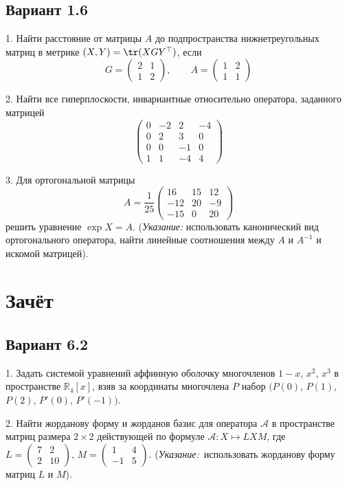 \documentclass[a4paper]{article}
\begin{document}
\subsection{Вариант 1.6}

1. Найти расстояние от матрицы $A$ до подпространства
нижнетреугольных матриц в метрике $(X, Y)=\tr (XGY^\top)$, если
$$
G=\left(\begin{array}{rr} 2 & 1\\
1 & 2
\end{array}\right) ,\qquad
A=\left(
\begin{array}{rr} 1 & 2\\
1 & 1
\end{array}\right)
$$

2. Найти все гиперплоскости, инвариантные относительно оператора,
заданного матрицей
$$
\left(
\begin{array}{rrrr}
0 & -2& 2 & -4\\
0 & 2 & 3 & 0\\
0 & 0 & -1 &0 \\
1 & 1 & -4 &4
\end{array}\right )
$$

3. Для ортогональной матрицы
$$
A=\frac{1}{25} \left(
\begin{array}{rrr}
16 & 15 & 12\\
-12 & 20 & -9 \\
-15 & 0 & 20
\end{array}\right)
$$
решить уравнение $\exp X=A$. ({\it Указание:} использовать
канонический вид ортогонального оператора, найти линейные
соотношения между $A$ и $A^{-1}$  и искомой матрицей).

\section{Зачёт }

\subsection{Вариант 6.2}

1. Задать системой уравнений аффинную оболочку многочленов $1-x$,
$x^2$, $x^3$ в пространстве $\mathbb{R}_4[x]$, взяв за координаты
многочлена $P$ набор $(P(0)$, $P(1)$, $P(2)$, $P'(0)$, $P'(-1))$.

2. Найти жорданову форму и жорданов базис для оператора
$\mathcal{A}$ в пространстве матриц размера $2\times 2$
действующей по формуле $\mathcal{A}: X \longmapsto LXM$, где
$L=\left(\begin{array}{rr} 7 & 2 \\ 2 & 10 \end{array}\right)$,
$M=\left(\begin{array}{rr} 1 & 4 \\ -1 & 5 \end{array}\right)$.
({\it Указание:}\ использовать жорданову форму матриц $L$ и $M$).
\end{document}
